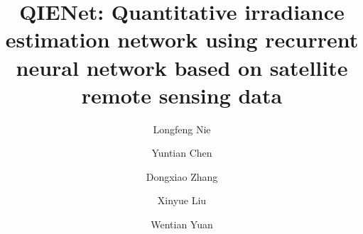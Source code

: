 \documentclass[review]{elsarticle}
\begin{document}

\begin{frontmatter}

    \title{QIENet: Quantitative irradiance estimation network using recurrent neural network based on satellite remote sensing data}

    \author[myaddress01,myaddress02]{Longfeng Nie}
    \author[myaddress03]{Yuntian Chen}
    \author[myaddress03,myaddress02,myaddress01]{Dongxiao Zhang}

    \author[myaddress01,myaddress04]{Xinyue Liu}
    \author[myaddress05]{Wentian Yuan}

    \address[myaddress01]{School of Environmental Science and Engineering, Southern University of Science and Technology, Shenzhen 518055, P. R. China}
    \address[myaddress02]{Peng Cheng Laboratory, Shenzhen, 518000, P. R. China}
    \address[myaddress03]{Ningbo Institute of Digital Twin, Eastern Institute of Technology, Ningbo, 315200, P. R. China}
    \address[myaddress04]{Department of Civil and Environmental Engineering, National University of Singapore, Singapore 117576, Singapore}
    \address[myaddress05]{Beijing Kingtansin Technology Company Limited, Beijing, 100000, P. R. China}



\end{frontmatter}
\end{document}
